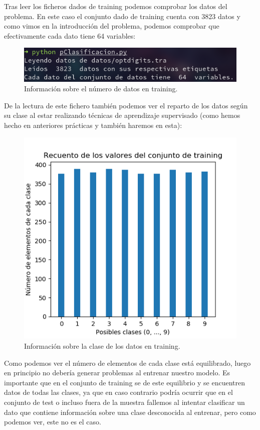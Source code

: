 \documentclass[12pt, spanish]{article}
\begin{document}
Tras leer los ficheros dados de training podemos comprobar los datos del problema. En este caso el conjunto dado de training cuenta con 3823 datos y como vimos en la introducción del problema, podemos comprobar que efectivamente cada dato tiene 64 variables:

\begin{figure}[H]
	\centering
	\includegraphics[scale=0.7]{clasificacion/num_datos.png}
	\caption{Información sobre el número de datos en training.}
	\label{datosClasificacion}
\end{figure}

De la lectura de este fichero también podemos ver el reparto de los datos según su clase al estar realizando técnicas de aprendizaje supervisado (como hemos hecho en anteriores prácticas y también haremos en esta):

\begin{figure}[H]
	\centering
	\includegraphics[scale=1]{clasificacion/datos_tra.png}
	\caption{Información sobre la clase de los datos en training.}
	\label{claseDatosClasificacion}
\end{figure}

Como podemos ver el número de elementos de cada clase está equilibrado, luego en principio no debería generar problemas al entrenar nuestro modelo. Es importante que en el conjunto de training se de este equilibrio y se encuentren datos de todas las clases, ya que en caso contrario podría ocurrir que en el conjunto de test o incluso fuera de la muestra fallemos al intentar clasificar un dato que contiene información sobre una clase desconocida al entrenar, pero como podemos ver, este no es el caso.
\end{document}
